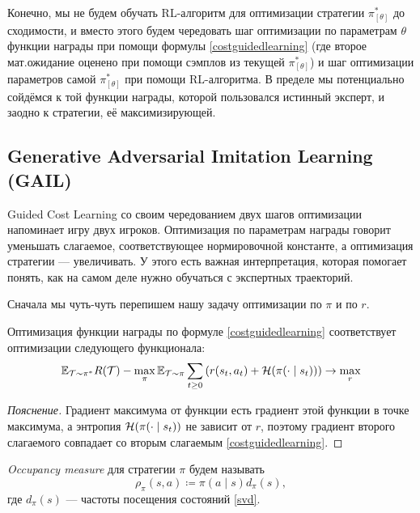 Конечно, мы не будем обучать RL-алгоритм для оптимизации стратегии $\pi^*_{[\theta]}$ до сходимости, и вместо этого будем чередовать шаг оптимизации по параметрам $\theta$ функции награды при помощи формулы \eqref{costguidedlearning} (где второе мат.ожидание оценено при помощи сэмплов из текущей $\pi^*_{[\theta]}$) и шаг оптимизации параметров самой $\pi^*_{[\theta]}$ при помощи RL-алгоритма. В пределе мы потенциально сойдёмся к той функции награды, которой пользовался истинный эксперт, и заодно к стратегии, её максимизирующей.

\subsection{Generative Adversarial Imitation Learning (GAIL)}

Guided Cost Learning со своим чередованием двух шагов оптимизации напоминает игру двух игроков. Оптимизация по параметрам награды говорит уменьшать слагаемое, соответствующее нормировочной константе, а оптимизация стратегии --- увеличивать. У этого есть важная интерпретация, которая помогает понять, как на самом деле нужно обучаться с экспертных траекторий.

Сначала мы чуть-чуть перепишем нашу задачу оптимизации по $\pi$ и по $r$.

\begin{proposition}
Оптимизация функции награды по формуле \eqref{costguidedlearning} соответствует оптимизации следующего функционала:
\begin{equation}\label{irl_dual}
\mathbb{E}_{\mathcal{T} \sim \pi^*} R(\mathcal{T}) - \max_{\pi} \mathbb{E}_{\mathcal{T} \sim \pi} \sum_{t \ge 0} \left( r(s_t, a_t) + \mathcal{H}(\pi(\cdot \mid s_t)) \right) \to \max_{r}
\end{equation}
\begin{proof}[Пояснение]
Градиент максимума от функции есть градиент этой функции в точке максимума, а энтропия $\mathcal{H}(\pi(\cdot \mid s_t))$ не зависит от $r$, поэтому градиент второго слагаемого совпадает со вторым слагаемым \eqref{costguidedlearning}.
\end{proof}
\end{proposition}

\begin{definition}
\emph{Occupancy measure} для стратегии $\pi$ будем называть
\begin{equation}\label{occupancymeasure}
\rho_\pi(s, a) \coloneqq \pi(a \mid s)d_{\pi}(s),
\end{equation}
где $d_\pi(s)$ --- частоты посещения состояний \eqref{svd}.
\end{definition}

